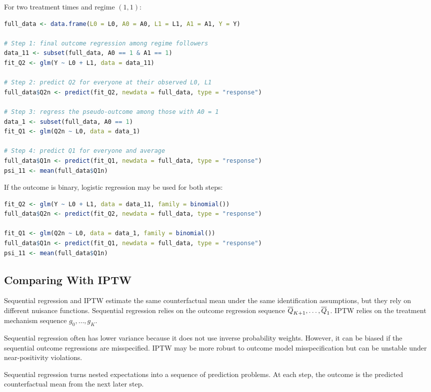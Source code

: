 For two treatment times and regime $(1,1)$:

\begin{lstlisting}[language=R]
full_data <- data.frame(L0 = L0, A0 = A0, L1 = L1, A1 = A1, Y = Y)

# Step 1: final outcome regression among regime followers
data_11 <- subset(full_data, A0 == 1 & A1 == 1)
fit_Q2 <- glm(Y ~ L0 + L1, data = data_11)

# Step 2: predict Q2 for everyone at their observed L0, L1
full_data$Q2n <- predict(fit_Q2, newdata = full_data, type = "response")

# Step 3: regress the pseudo-outcome among those with A0 = 1
data_1 <- subset(full_data, A0 == 1)
fit_Q1 <- glm(Q2n ~ L0, data = data_1)

# Step 4: predict Q1 for everyone and average
full_data$Q1n <- predict(fit_Q1, newdata = full_data, type = "response")
psi_11 <- mean(full_data$Q1n)
\end{lstlisting}

If the outcome is binary, logistic regression may be used for both steps:

\begin{lstlisting}[language=R]
fit_Q2 <- glm(Y ~ L0 + L1, data = data_11, family = binomial())
full_data$Q2n <- predict(fit_Q2, newdata = full_data, type = "response")

fit_Q1 <- glm(Q2n ~ L0, data = data_1, family = binomial())
full_data$Q1n <- predict(fit_Q1, newdata = full_data, type = "response")
psi_11 <- mean(full_data$Q1n)
\end{lstlisting}

\subsection{Comparing With IPTW}

Sequential regression and IPTW estimate the same counterfactual mean under the
same identification assumptions, but they rely on different nuisance functions.
Sequential regression relies on the outcome regression sequence
$\overline{Q}_{K+1},\ldots,\overline{Q}_1$. IPTW relies on the treatment mechanism sequence
$g_0,\ldots,g_K$.

Sequential regression often has lower variance because it does not use inverse
probability weights. However, it can be biased if the sequential outcome
regressions are misspecified. IPTW may be more robust to outcome model
misspecification but can be unstable under near-positivity violations.

\begin{keyidea}
Sequential regression turns nested expectations into a sequence of prediction
problems. At each step, the outcome is the predicted counterfactual mean from
the next later step.
\end{keyidea}
